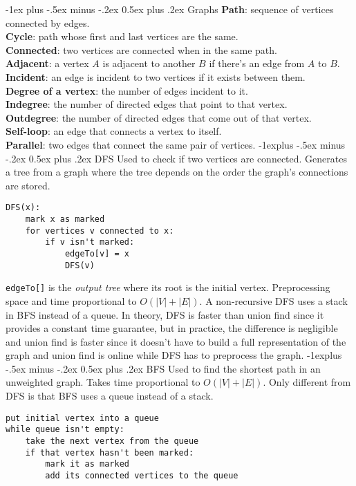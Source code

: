 \documentclass[10pt,landscape]{article}
\makeatletter
\renewcommand{\section}{\@startsection{section}{1}{0mm}%
                                {-1ex plus -.5ex minus -.2ex}%
                                {0.5ex plus .2ex}%
                                {\normalfont\large\bfseries}}
\renewcommand{\subsection}{\@startsection{subsection}{2}{0mm}%
                                {-1explus -.5ex minus -.2ex}%
                                {0.5ex plus .2ex}%
                                {\normalfont\normalsize\bfseries}}
\makeatother
\begin{document}
\begin{multicols}{3}
\section{Graphs}
\textbf{Path}: sequence of vertices connected by edges.\\
\textbf{Cycle}: path whose first and last vertices are the same.\\
\textbf{Connected}: two vertices are connected when in the same path.\\
\textbf{Adjacent}: a vertex $A$ is adjacent to another $B$ if there's an edge from $A$ to $B$.\\
\textbf{Incident}: an edge is incident to two vertices if it exists between them.\\
\textbf{Degree of a vertex}: the number of edges incident to it.\\
\textbf{Indegree}: the number of directed edges that point to that vertex.\\
\textbf{Outdegree}: the number of directed edges that come out of that vertex.\\
\textbf{Self-loop}: an edge that connects a vertex to itself.\\
\textbf{Parallel}: two edges that connect the same pair of vertices.
\subsection{DFS}
Used to check if two vertices are connected. Generates a tree from a graph where the tree depends on the order the graph's connections are stored.
\begin{verbatim}
DFS(x):
    mark x as marked
    for vertices v connected to x:
        if v isn't marked:
            edgeTo[v] = x
            DFS(v)
\end{verbatim}
\texttt{edgeTo[]} is the \textit{output tree} where its root is the initial vertex. Preprocessing space and time proportional to $O(|V|+|E|)$. A non-recursive DFS uses a stack in BFS instead of a queue. In theory, DFS is faster than union find since it provides a constant time guarantee, but in practice, the difference is negligible and union find is faster since it doesn't have to build a full representation of the graph and union find is online while DFS has to preprocess the graph. 
\subsection{BFS}
Used to find the shortest path in an unweighted graph. Takes time proportional to $O(|V|+|E|)$. Only different from DFS is that BFS uses a queue instead of a stack.
\begin{verbatim}
put initial vertex into a queue
while queue isn't empty:
    take the next vertex from the queue
    if that vertex hasn't been marked:
        mark it as marked
        add its connected vertices to the queue
\end{verbatim}

\end{multicols}
\end{document}
